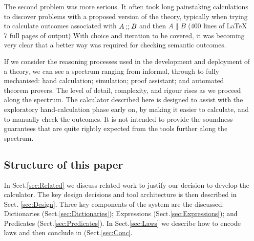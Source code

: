 The second problem was more serious.
It often took long painstaking calculations to discover problems
with a proposed version of the theory,
typically when trying to calculate outcomes associated with
$A \mathbin{\mathbf{;\!;}} B$ and then  $A \parallel B$
(400 lines of \LaTeX\,7 full pages of output)
With choice and iteration to be covered,
it was becoming very clear that a better way was required
for checking semantic outcomes.

If we consider the reasoning processes used in the development
and deployment of a theory, we can see a spectrum ranging from informal,
through to fully mechanised: hand calculation; simulation; proof assistant;
and automated theorem provers.
The level of detail, complexity, and rigour rises as we proceed along the spectrum.
The calculator described here is designed
to assist with the exploratory hand-calculation phase early on,
by making it easier to calculate, and to manually check the outcomes.
It is not intended to provide the soundness guarantees that are quite rightly
expected from the tools further along the spectrum.


\subsection{Structure of this paper}

In Sect.\ref{sec:Related} we discuss related work
to justify our decision to develop the calculator.
The key design decisions and tool architecture is then described
in Sect. \ref{sec:Design}.
Three key components of the system are the discussed:
Dictionaries (Sect.\ref{sec:Dictionaries});
Expressions (Sect.\ref{sec:Expressions}); and
Predicates (Sect.\ref{sec:Predicates}).
In Sect.\ref{sec:Laws} we describe how to encode laws
and then conclude in (Sect.\ref{sec:Conc}.

